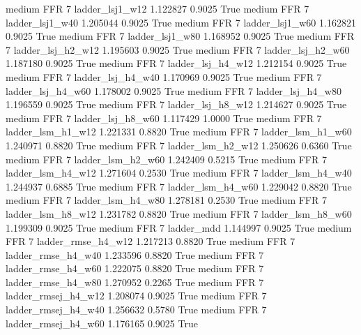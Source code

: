     medium      FFR                 7     ladder_lsj1_w12   1.122827      0.9025    True
    medium      FFR                 7     ladder_lsj1_w40   1.205044      0.9025    True
    medium      FFR                 7     ladder_lsj1_w60   1.162821      0.9025    True
    medium      FFR                 7     ladder_lsj1_w80   1.168952      0.9025    True
    medium      FFR                 7   ladder_lsj_h2_w12   1.195603      0.9025    True
    medium      FFR                 7   ladder_lsj_h2_w60   1.187180      0.9025    True
    medium      FFR                 7   ladder_lsj_h4_w12   1.212154      0.9025    True
    medium      FFR                 7   ladder_lsj_h4_w40   1.170969      0.9025    True
    medium      FFR                 7   ladder_lsj_h4_w60   1.178002      0.9025    True
    medium      FFR                 7   ladder_lsj_h4_w80   1.196559      0.9025    True
    medium      FFR                 7   ladder_lsj_h8_w12   1.214627      0.9025    True
    medium      FFR                 7   ladder_lsj_h8_w60   1.117429      1.0000    True
    medium      FFR                 7   ladder_lsm_h1_w12   1.221331      0.8820    True
    medium      FFR                 7   ladder_lsm_h1_w60   1.240971      0.8820    True
    medium      FFR                 7   ladder_lsm_h2_w12   1.250626      0.6360    True
    medium      FFR                 7   ladder_lsm_h2_w60   1.242409      0.5215    True
    medium      FFR                 7   ladder_lsm_h4_w12   1.271604      0.2530    True
    medium      FFR                 7   ladder_lsm_h4_w40   1.244937      0.6885    True
    medium      FFR                 7   ladder_lsm_h4_w60   1.229042      0.8820    True
    medium      FFR                 7   ladder_lsm_h4_w80   1.278181      0.2530    True
    medium      FFR                 7   ladder_lsm_h8_w12   1.231782      0.8820    True
    medium      FFR                 7   ladder_lsm_h8_w60   1.199309      0.9025    True
    medium      FFR                 7          ladder_mdd   1.144997      0.9025    True
    medium      FFR                 7  ladder_rmse_h4_w12   1.217213      0.8820    True
    medium      FFR                 7  ladder_rmse_h4_w40   1.233596      0.8820    True
    medium      FFR                 7  ladder_rmse_h4_w60   1.222075      0.8820    True
    medium      FFR                 7  ladder_rmse_h4_w80   1.270952      0.2265    True
    medium      FFR                 7 ladder_rmsej_h4_w12   1.208074      0.9025    True
    medium      FFR                 7 ladder_rmsej_h4_w40   1.256632      0.5780    True
    medium      FFR                 7 ladder_rmsej_h4_w60   1.176165      0.9025    True
